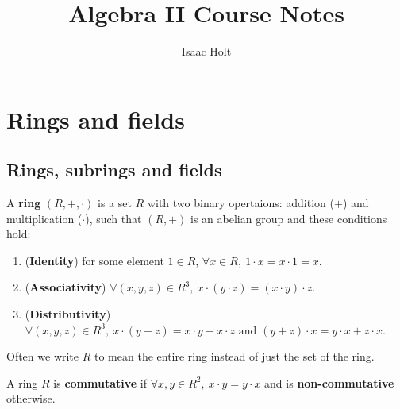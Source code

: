 

\title{Algebra II Course Notes}
\author{Isaac Holt}





\section{Rings and fields}

\subsection{Rings, subrings and fields}

\begin{definition}
	A \textbf{ring} $(R, +, \cdot)$ is a set $R$ with two binary opertaions: addition ($+$) and multiplication ($\cdot$), such that $(R, +)$ is an abelian group and these conditions hold:
	\begin{enumerate}
		\item (\textbf{Identity}) for some element $1 \in R$, $\forall x \in R, \ 1 \cdot x = x \cdot 1 = x$.
		\item (\textbf{Associativity}) $\forall (x, y, z) \in R^3, \ x \cdot (y \cdot z) = (x \cdot y) \cdot z$.
		\item (\textbf{Distributivity}) $\forall (x, y, z) \in R^3, \ x \cdot (y + z) = x \cdot y + x \cdot z \text{ and } (y + z) \cdot x = y \cdot x + z \cdot x$. 
	\end{enumerate}
\end{definition}

\begin{remark}
	Often we write $R$ to mean the entire ring instead of just the set of the ring.
\end{remark}

\begin{definition}
	A ring $R$ is \textbf{commutative} if $\forall x, y \in R^2, \ x \cdot y = y \cdot x$ and is \textbf{non-commutative} otherwise.
\end{definition}

